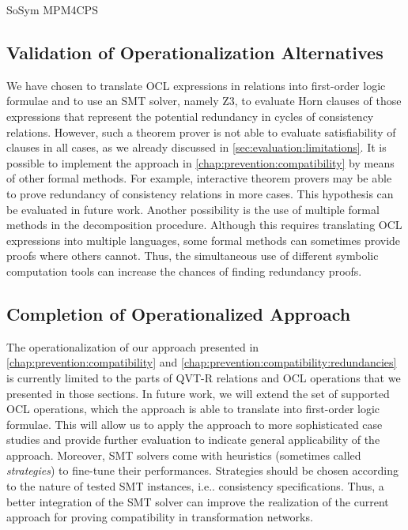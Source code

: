 \begin{copiedFrom}{SoSym MPM4CPS}
\subsection{Validation of Operationalization Alternatives}
We have chosen to translate OCL expressions in \qvtr relations into first-order logic formulae and to use an SMT solver, namely Z3, to evaluate Horn clauses of those expressions that represent the potential redundancy in cycles of consistency relations. However, such a theorem prover is not able to evaluate satisfiability of clauses in all cases, as we already discussed in \autoref{sec:evaluation:limitations}. It is possible to implement the approach in \autoref{chap:prevention:compatibility} by means of other formal methods. For example, interactive theorem provers may be able to prove redundancy of consistency relations in more cases. This hypothesis can be evaluated in future work. Another possibility is the use of multiple formal methods in the decomposition procedure. Although this requires translating OCL expressions into multiple languages, some formal methods can sometimes provide proofs where others cannot. Thus, the simultaneous use of different symbolic computation tools can increase the chances of finding redundancy proofs.


\subsection{Completion of Operationalized Approach}
The operationalization of our approach presented in \autoref{chap:prevention:compatibility} and \autoref{chap:prevention:compatibility:redundancies} is currently limited to the parts of QVT-R relations and OCL operations that we presented in those sections. In future work, we will extend the set of supported OCL operations, which the approach is able to translate into first-order logic formulae.
This will allow us to apply the approach to more sophisticated case studies and provide further evaluation to indicate general applicability of the approach.
Moreover, SMT solvers come with heuristics (sometimes called \textit{strategies}) to fine-tune their performances. Strategies should be chosen according to the nature of tested SMT instances, i.e.. consistency specifications. Thus, a better integration of the SMT solver can improve the realization of the current approach for proving compatibility in transformation networks.


\end{copiedFrom}
